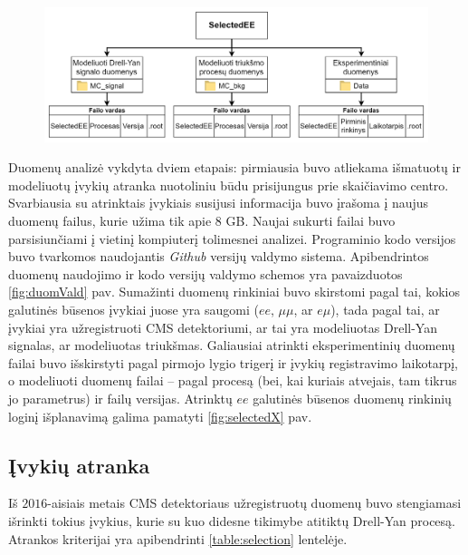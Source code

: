 \documentclass[a4paper, 12pt, oneside]{article}
\newcommand{\emu}{e\mu}
\begin{document}
\begin{figure}[H]
	\includegraphics[width=\textwidth]{atrinktu_duomenu_schema_v1.png}
\end{figure}

Duomenų analizė vykdyta dviem etapais: pirmiausia buvo atliekama išmatuotų ir modeliuotų įvykių atranka nuotoliniu
būdu prisijungus prie skaičiavimo centro.
Svarbiausia su atrinktais įvykiais susijusi informacija buvo įrašoma į naujus duomenų failus, kurie užima tik
apie $8$ GB.
Naujai sukurti failai buvo parsisiunčiami į vietinį kompiuterį tolimesnei analizei.
Programinio kodo versijos buvo tvarkomos naudojantis \textit{Github} versijų valdymo sistema.
Apibendrintos duomenų naudojimo ir kodo versijų valdymo schemos yra pavaizduotos \ref{fig:duomVald} pav.
Sumažinti duomenų rinkiniai buvo skirstomi pagal tai, kokios galutinės būsenos įvykiai juose yra saugomi
($ee$, $\mu\mu$, ar $\emu$), tada pagal tai, ar įvykiai yra užregistruoti CMS detektoriumi, ar tai yra modeliuotas
Drell-Yan signalas, ar modeliuotas triukšmas.
Galiausiai atrinkti eksperimentinių duomenų failai buvo išskirstyti pagal pirmojo lygio trigerį ir įvykių
registravimo laikotarpį, o modeliuoti duomenų failai -- pagal procesą (bei, kai kuriais atvejais, tam tikrus
jo parametrus) ir failų versijas.
Atrinktų $ee$ galutinės būsenos duomenų rinkinių loginį išplanavimą galima pamatyti \ref{fig:selectedX} pav.

\subsection{Įvykių atranka}\label{sec:selection}
Iš $2016$-aisiais metais CMS detektoriaus užregistruotų duomenų buvo stengiamasi išrinkti tokius įvykius, kurie
su kuo didesne tikimybe atitiktų Drell-Yan procesą.
Atrankos kriterijai yra apibendrinti \ref{table:selection} lentelėje.
\end{document}
